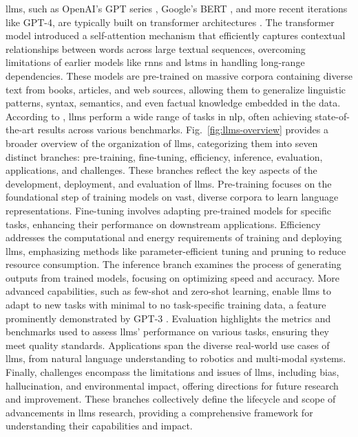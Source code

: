 \glspl{llm}, such as OpenAI's GPT series \cite{Radford2018ImprovingLU}, Google's BERT \cite{Devlin2019BERTPO}, and more recent iterations like GPT-4, are typically built on transformer architectures \cite{Vaswani2017}.
The transformer model introduced a self-attention mechanism that efficiently captures contextual relationships between words across large textual sequences, overcoming limitations of earlier models like \glspl{rnn} and \glspl{lstm} in handling long-range dependencies.
These models are pre-trained on massive corpora containing diverse text from books, articles, and web sources, allowing them to generalize linguistic patterns, syntax, semantics, and even factual knowledge embedded in the data.
According to \textcite{Chang2024}, \glspl{llm} perform a wide range of tasks in \gls{nlp}, often achieving state-of-the-art results across various benchmarks.
Fig.~\ref{fig:llms-overview} provides a broader overview of the organization of \glspl{llm}, categorizing them into seven distinct branches: pre-training, fine-tuning, efficiency, inference, evaluation, applications, and challenges.
These branches reflect the key aspects of the development, deployment, and evaluation of \glspl{llm}.
Pre-training focuses on the foundational step of training models on vast, diverse corpora to learn language representations.
Fine-tuning involves adapting pre-trained models for specific tasks, enhancing their performance on downstream applications.
Efficiency addresses the computational and energy requirements of training and deploying \glspl{llm}, emphasizing methods like parameter-efficient tuning and pruning to reduce resource consumption.
The inference branch examines the process of generating outputs from trained models, focusing on optimizing speed and accuracy.
More advanced capabilities, such as few-shot and zero-shot learning, enable \glspl{llm} to adapt to new tasks with minimal to no task-specific training data, a feature prominently demonstrated by GPT-3 \cite{NEURIPS2020_1457c0d6}.
Evaluation highlights the metrics and benchmarks used to assess \glspl{llm}' performance on various tasks, ensuring they meet quality standards.
Applications span the diverse real-world use cases of \glspl{llm}, from natural language understanding to robotics and multi-modal systems.
Finally, challenges encompass the limitations and issues of \glspl{llm}, including bias, hallucination, and environmental impact, offering directions for future research and improvement.
These branches collectively define the lifecycle and scope of advancements in \glspl{llm} research, providing a comprehensive framework for understanding their capabilities and impact.

